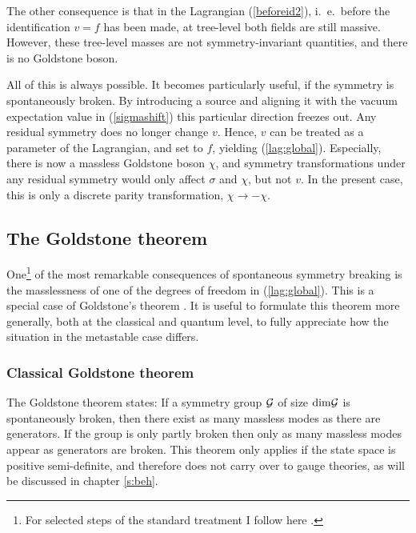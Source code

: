 \documentclass[final,12pt]{article}
\newcommand*{\pref}[1]{(\ref{#1})}
\newcommand*{\1}{1\!\!\!\bot}
\begin{document}
The other consequence is that in the Lagrangian \pref{beforeid2}, i.\ e.\ before the identification $v=f$ has been made, at tree-level both fields are still massive. However, these tree-level masses are not symmetry-invariant quantities, and there is no Goldstone boson.

All of this is always possible. It becomes particularly useful, if the symmetry is spontaneously broken. By introducing a source and aligning it with the vacuum expectation value in \pref{sigmashift} this particular direction freezes out. Any residual symmetry does no longer change $v$. Hence, $v$ can be treated as a parameter of the Lagrangian, and set to $f$, yielding \pref{lag:global}. Especially, there is now a massless Goldstone boson $\chi$, and symmetry transformations under any residual symmetry would only affect $\sigma$ and $\chi$, but not $v$. In the present case, this is only a discrete parity transformation, $\chi\to-\chi$.

\subsection{The Goldstone theorem}\label{ss:goldstone}

One\footnote{For selected steps of the standard treatment I follow here \cite{Bohm:2001yx}.} of the most remarkable consequences of spontaneous symmetry breaking is the masslessness of one of the degrees of freedom in \pref{lag:global}. This is a special case of Goldstone's theorem \cite{Goldstone:1961eq,Bohm:2001yx,Strocchi:2015uaa}. It is useful to formulate this theorem more generally, both at the classical and quantum level, to fully appreciate how the situation in the metastable case differs.

\subsubsection{Classical Goldstone theorem}\label{sss:cgoldstone}

The Goldstone theorem \cite{Goldstone:1961eq} states: If a symmetry group ${\cal G}$ of size $\mathrm{dim}{\cal G}$ is spontaneously broken, then there exist as many massless modes as there are generators. If the group is only partly broken then only as many massless modes appear as generators are broken. This theorem only applies if the state space is positive semi-definite, and therefore does not carry over to gauge theories, as will be discussed in chapter \ref{s:beh}.
\end{document}
